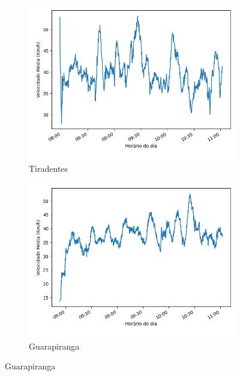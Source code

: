 \begin{figure}
\centering
\begin{subfigure}{.5\textwidth}
  \centering
\includegraphics[width=\textwidth]{figuras/detect_graphics/avg_speed_7-dez-su-corr_Tiradentes.png}
\caption{Tiradentes}
\label{fig::avg_speed_Tiradentes}
\end{subfigure}%
\begin{subfigure}{.5\textwidth}
 \centering
 \includegraphics[width=\textwidth]{figuras/detect_graphics/avg_speed_7-dez-su-corr_Guarapiranga.png}
 \caption{Guarapiranga}
 \label{fig::avg_speed_Guarapiranga}
\end{subfigure}

\end{figure}
